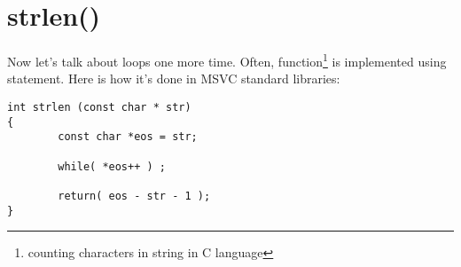 ﻿\section{strlen()}

{Now let's talk about loops one more time. Often,  
function\footnote{counting characters in string in C language} is implemented using  statement.}
{Here is how it's done in MSVC standard libraries:}

\begin{lstlisting}
int strlen (const char * str)
{
        const char *eos = str;

        while( *eos++ ) ;

        return( eos - str - 1 );
}
\end{lstlisting}





